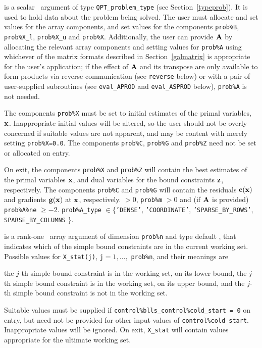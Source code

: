 \documentclass{galahad}
\begin{document}
\vspace*{-3mm}
\begin{description}
 is a scalar \intentinout\ argument of type
{\tt QPT\_problem\_type}
(see Section~\ref{typeprob}).
It is used to hold data about the problem being solved.
The user must allocate and set values for the array components,
and set values for the components
{\tt prob\%B}, {\tt prob\%X\_l}, {\tt prob\%X\_u} and {\tt prob\%X}.
Additionally, the user can provide ${\mathbf{A}}$ by allocating the
relevant array components and setting values for {\tt prob\%A}
using whichever
of the matrix formats described in Section~\ref{galmatrix}
is appropriate for the user's application;
if the effect of ${\mathbf{A}}$ and its transpose are only available to form products
via reverse communication (see {\tt reverse} below)
or with a pair of user-supplied subroutines (see {\tt eval\_APROD}
and {\tt eval\_ASPROD} below), {\tt prob\%A} is not needed.

The components {\tt prob\%X}
must be set to initial estimates of the primal variables, ${\mathbf{x}}$.
Inappropriate initial values will be altered, so the user should
not be overly concerned if suitable values are not apparent, and may be
content with merely setting {\tt prob\%X=0.0}.
The components {\tt prob\%C}, {\tt prob\%G} and {\tt prob\%Z}
need not be set or allocated on entry.

On exit, the components {\tt prob\%X} and {\tt prob\%Z}
will contain the best estimates of the primal variables ${\mathbf{x}}$,
and dual variables for the bound constraints ${\mathbf{z}}$, respectively.
The components {\tt prob\%C} and {\tt prob\%G}
will contain the residuals ${\mathbf{c}}({\mathbf{x}})$
and gradients ${\mathbf{g}}({\mathbf{x}})$ at ${\mathbf{x}}$, respectively.
 $> 0$, {\tt prob\%m} $> 0$
              and (if ${\mathbf{A}}$ is provided) {\tt prob\%A\%ne} $\geq -2$.
{\tt prob\%A\_type} $\in \{${\tt 'DENSE'},
 {\tt 'COORDINATE'}, {\tt 'SPARSE\_BY\_\-ROWS'}, {\tt SPARSE\_BY\_COLUMNS}
$\}$.

 is a rank-one \intentinout\ array argument of dimension {\tt prob\%n}
and type default \integer, that indicates which of the simple bound
constraints are in the current working set. Possible values for
{\tt X\_stat(j)}, {\tt j}$=1, \ldots ,$ {\tt prob\%n}, and their meanings are
\begin{description}
 the $j$-th simple bound constraint
is in the working set, on its lower bound,
 the $j$-th simple bound constraint
is in the working set, on its upper bound, and
  the $j$-th simple bound constraint is not in the working set.
\end{description}
Suitable values must be supplied if
{\tt control\%blls\_control\%cold\_start = 0} on entry,
but need not be provided for other input values of {\tt control\%cold\_start}.
Inappropriate values will be ignored.
On exit, {\tt X\_stat} will contain values appropriate for the ultimate
working set.


\end{description}
\end{document}
